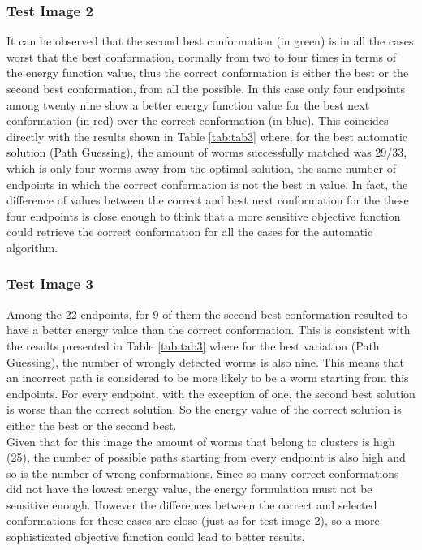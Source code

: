 \subsubsection*{Test Image 2}


It can be observed that the second best conformation (in green) is in all 
the cases worst that the best conformation, normally from two to four times 
in terms of the energy function value, thus the correct conformation is 
either the best or the second best conformation, from all the possible.
In this case only four endpoints among twenty nine show a better energy
function value for the best next conformation (in red) over the correct 
conformation (in blue). This coincides directly with the results shown
in Table \ref{tab:tab3} where, for the best automatic solution (Path Guessing),
the amount of worms successfully matched was 29/33, which is only four worms
away from the optimal solution, the same number of endpoints in which the
correct conformation is not the best in value. In fact, the difference of 
values between the correct and best next conformation for the these four
endpoints is close enough to think that a more sensitive objective function
could retrieve the correct conformation for all the cases for the automatic
algorithm.\\ 

\subsubsection*{Test Image 3}

Among the 22 endpoints, for 9
of them the second best conformation resulted to have a better energy value
than the correct conformation. This is consistent with the results presented
in Table \ref{tab:tab3} where for the best variation (Path Guessing), the
number of wrongly detected worms is also nine. This means that an incorrect 
path is considered to be more likely to be a worm starting from this
endpoints. For every endpoint, with the exception of one, the second best 
solution is worse than the correct solution. So the energy value of the 
correct solution is either the best or the second best.\\

Given that for this image the amount of worms that belong to clusters
is high (25), the number of possible paths starting
from every endpoint is also high and so is the number of wrong conformations.
Since so many correct conformations did not have the lowest energy value,
the energy formulation must not be sensitive enough. However
the differences between the correct and selected conformations for
these cases are close (just as for test image 2), so a more sophisticated objective function could lead
to better results.\\

